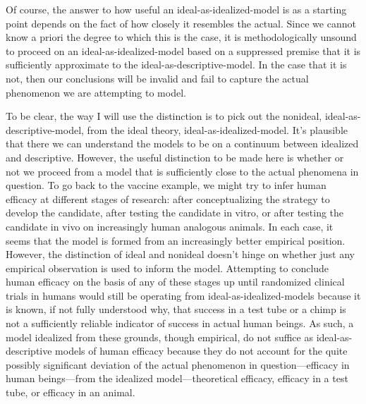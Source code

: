 \documentclass[letterpaper,notitlepage,12pt]{article}
\begin{document}
Of course, the answer to how useful an ideal-as-idealized-model is as a starting
point depends on the fact of how closely it resembles the actual.
Since we cannot know a priori the degree to which this is the case, it is
methodologically unsound to proceed on an ideal-as-idealized-model based on a
suppressed premise that it is sufficiently approximate to the
ideal-as-descriptive-model.
In the case that it is not, then our conclusions will be invalid and fail to
capture the actual phenomenon we are attempting to model.

To be clear, the way I will use the distinction is to pick out the nonideal,
ideal-as-descriptive-model, from the ideal theory, ideal-as-idealized-model.
It's plausible that there we can understand the models to be on a continuum
between idealized and descriptive.
However, the useful distinction to be made here is whether or not we proceed
from a model that is sufficiently close to the actual phenomena in question.
To go back to the vaccine example, we might try to infer human efficacy at
different stages of research: after conceptualizing the strategy to develop the
candidate, after testing the candidate in vitro, or after testing the candidate
in vivo on increasingly human analogous animals.
In each case, it seems that the model is formed from an increasingly better
empirical position.
However, the distinction of ideal and nonideal doesn't hinge on whether just any
empirical observation is used to inform the model.
Attempting to conclude human efficacy on the basis of any of these stages up
until randomized clinical trials in humans  would
still be operating from ideal-as-idealized-models because it is known, if not 
fully understood why, that success in a test tube or a chimp is not a sufficiently 
reliable indicator of success in actual human beings.
As such, a model idealized from these grounds, though empirical, do not suffice
as ideal-as-descriptive models of human efficacy because they do not account for
the quite possibly significant deviation of the actual phenomenon in 
question---efficacy in human beings---from the idealized model---theoretical
efficacy, efficacy in a test tube, or efficacy in an animal.
\end{document}
